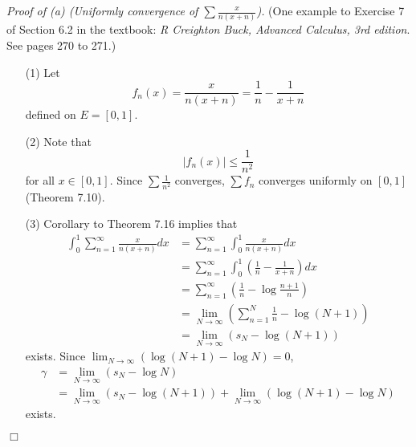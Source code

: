 \documentclass{article}
\begin{document}
\emph{Proof of (a) (Uniformly convergence of $\sum \frac{x}{n(x+n)}$).}
(One example to Exercise 7 of Section 6.2 in the textbook:
\emph{R Creighton Buck, Advanced Calculus, 3rd edition}.
See pages 270 to 271.)
\begin{enumerate}
\item[(1)]
Let
\[
  f_n(x) = \frac{x}{n(x+n)} = \frac{1}{n} - \frac{1}{x+n}
\]
defined on $E = [0,1]$.

\item[(2)]
Note that
\[
  |f_n(x)| \leq \frac{1}{n^2}
\]
for all $x \in [0,1]$. Since $\sum \frac{1}{n^2}$ converges,
$\sum f_n$ converges uniformly on $[0,1]$ (Theorem 7.10).

\item[(3)]
Corollary to Theorem 7.16 implies that
\begin{align*}
  \int_{0}^{1} \sum_{n=1}^{\infty} \frac{x}{n(x+n)} dx
  &= \sum_{n=1}^{\infty} \int_{0}^{1} \frac{x}{n(x+n)} dx \\
  &= \sum_{n=1}^{\infty} \int_{0}^{1} \left( \frac{1}{n} - \frac{1}{x+n} \right) dx \\
  &= \sum_{n=1}^{\infty} \left( \frac{1}{n} - \log\frac{n+1}{n} \right) \\
  &= \lim_{N \to \infty}
    \left( \sum_{n=1}^{N} \frac{1}{n} - \log(N+1) \right) \\
  &= \lim_{N \to \infty}
    \left( s_N - \log(N+1) \right)
\end{align*}
exists.
Since $\lim_{N \to \infty}(\log(N+1) - \log N) = 0$,
\begin{align*}
  \gamma
  &= \lim_{N \to \infty}( s_N - \log N ) \\
  &= \lim_{N \to \infty}( s_N - \log(N+1) ) + \lim_{N \to \infty}(\log(N+1) - \log N)
\end{align*}
exists.
\end{enumerate}
$\Box$ \\
\end{document}
